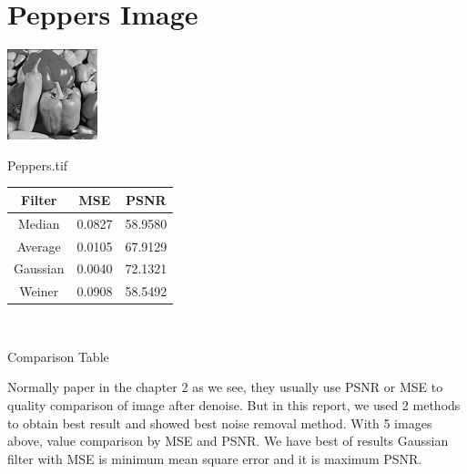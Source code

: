 \section*{Peppers Image}
\begin{center}
\includegraphics{Peppers.png}	
	
	\vspace{1cm}
	Peppers.tif
	
	\begin{tabular}{|c|c|c|}
		\hline 
		Filter & MSE & PSNR \\ 
		\hline 
		Median & 0.0827 & 58.9580 \\ 
		\hline 
		Average & 0.0105 & 67.9129 \\ 
		\hline 
		Gaussian & 0.0040 & 72.1321 \\ 
		\hline 
		Weiner & 0.0908 & 58.5492 \\ 
		\hline 
	\end{tabular} 
	
	\
	
	Comparison Table
\end{center}
\vspace{1cm}

Normally paper in the chapter 2 as we see, they usually use PSNR or MSE to quality comparison of image after denoise. But in this report, we used 2 methods to obtain best result and showed best noise removal method. With 5 images above, value comparison by MSE and PSNR. We have best of results Gaussian filter with MSE is minimum mean square error and it is maximum PSNR.









